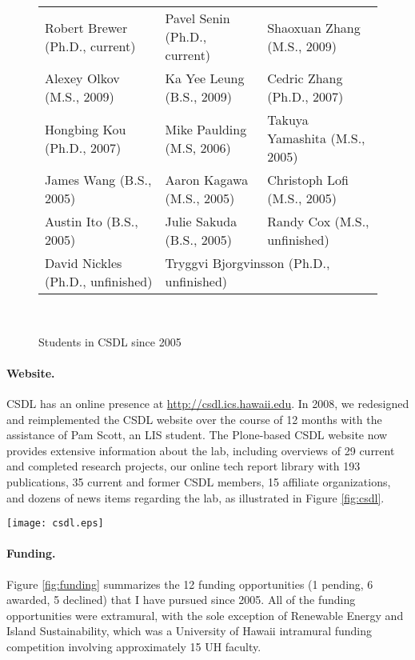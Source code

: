 \documentclass[11pt]{article}
\begin{document}
\begin{figure}[ht]
\small
\begin{tabular}{p{2in}p{2in}p{2in}} \hline
Robert Brewer (Ph.D., current) & Pavel Senin (Ph.D., current)  & Shaoxuan Zhang (M.S., 2009) \\
Alexey Olkov (M.S., 2009) & Ka Yee Leung (B.S., 2009) & Cedric Zhang (Ph.D., 2007) \\
Hongbing Kou (Ph.D., 2007) & Mike Paulding (M.S, 2006)  & Takuya Yamashita (M.S., 2005) \\
James Wang (B.S., 2005) & Aaron Kagawa (M.S., 2005) & Christoph Lofi (M.S., 2005) \\
Austin Ito (B.S., 2005) & Julie Sakuda (B.S., 2005) & Randy Cox (M.S., unfinished) \\
David Nickles (Ph.D., unfinished) & \multicolumn{2}{l}{Tryggvi Bjorgvinsson (Ph.D., unfinished)}  \\ \hline
\end{tabular} \\ 
\normalsize
\caption{Students in CSDL since 2005}
\label{fig:students}
\end{figure}

\paragraph{Website.} CSDL has an online presence at
\url{http://csdl.ics.hawaii.edu}. In 2008, we redesigned and reimplemented 
the CSDL website over the course of 12 months with the
assistance of Pam Scott, an LIS student.  The Plone-based CSDL website 
now provides extensive information about the lab, including overviews of
29 current and completed research projects, our online tech
report library with 193 publications, 35 current and former CSDL
members, 15 affiliate organizations, and dozens of news items regarding the lab, as
illustrated in Figure \ref{fig:csdl}.

\begin{figure*}[th]
  \center
  \texttt{[image: csdl.eps]}
  \caption{The CSDL Home Page}
  \label{fig:csdl}
\end{figure*} 

\newpage
\paragraph{Funding.} Figure \ref{fig:funding} summarizes the 12 funding opportunities (1 pending, 6 awarded, 5 declined) that I have pursued since 2005. All of the funding opportunities were extramural, with the sole exception of Renewable Energy and Island Sustainability, which was a University of Hawaii intramural funding competition involving approximately 15 UH faculty. 
\end{document}

